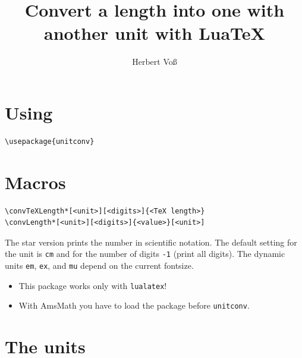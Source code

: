 \documentclass[english,parskip=half]{scrartcl}
\title{Convert a length into one with another unit
with Lua\TeX}
\author{Herbert Voß}
\begin{document}
\maketitle
\tableofcontents
\section{Using}

\begin{verbatim}
\usepackage{unitconv}
\end{verbatim}


\section{Macros}

\begin{verbatim}
\convTeXLength*[<unit>][<digits>]{<TeX length>}
\convLength*[<unit>][<digits>]{<value>}[<unit>]
\end{verbatim}

The star version prints the number in scientific notation. 
The default setting for the unit is \verb|cm| 
and for the number of digits \verb|-1| (print all digits).
The dynamic units \verb|em|, \verb|ex|, and \verb|mu| depend on the
current fontsize. 

\begin{itemize}
\item This package works only with \verb|lualatex|!
\item With \textsf{AmsMath} you have to load the package before \texttt{unitconv}.
\end{itemize}


\section{The units}
\end{document}

